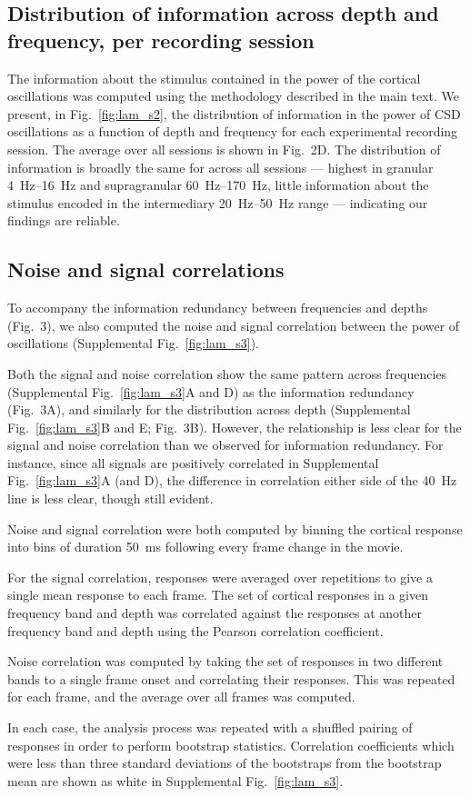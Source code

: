 \subsection{Distribution of information across depth and frequency, per recording session}

The information about the stimulus contained in the power of the cortical oscillations was computed using the methodology described in the main text.
We present, in Fig.~\ref{fig:lam_s2}, the distribution of information in the power of \ac{CSD} oscillations as a function of depth and frequency for each experimental recording session.
The average over all sessions is shown in Fig.~2D.
The distribution of information is broadly the same for across all sessions --- highest in granular \SIrange{4}{16}{Hz} and supragranular \SIrange{60}{170}{Hz}, little information about the stimulus encoded in the intermediary \SIrange{20}{50}{Hz} range --- indicating our findings are reliable.


\subsection{Noise and signal correlations}

To accompany the information redundancy between frequencies and depths (Fig.~3), we also computed the noise and signal correlation between the power of oscillations (Supplemental Fig.~\ref{fig:lam_s3}).

Both the signal and noise correlation show the same pattern across frequencies (Supplemental Fig.~\ref{fig:lam_s3}A and D) as the information redundancy (Fig.~3A), and similarly for the distribution across depth (Supplemental Fig.~\ref{fig:lam_s3}B and E; Fig.~3B).
However, the relationship is less clear for the signal and noise correlation than we observed for information redundancy.
For instance, since all signals are positively correlated in Supplemental Fig.~\ref{fig:lam_s3}A (and D), the difference in correlation either side of the \SI{40}{Hz} line is less clear, though still evident.

Noise and signal correlation were both computed by binning the cortical response into bins of duration \SI{50}{\milli\second} following every frame change in the movie.

For the signal correlation, responses were averaged over repetitions to give a single mean response to each frame.
The set of cortical responses in a given frequency band and depth was correlated against the responses at another frequency band and depth using the Pearson correlation coefficient.

Noise correlation was computed by taking the set of responses in two different bands to a single frame onset and correlating their responses.
This was repeated for each frame, and the average over all frames was computed.

In each case, the analysis process was repeated with a shuffled pairing of responses in order to perform bootstrap statistics.
Correlation coefficients which were less than three standard deviations of the bootstraps from the bootstrap mean are shown as white in Supplemental Fig.~\ref{fig:lam_s3}.
